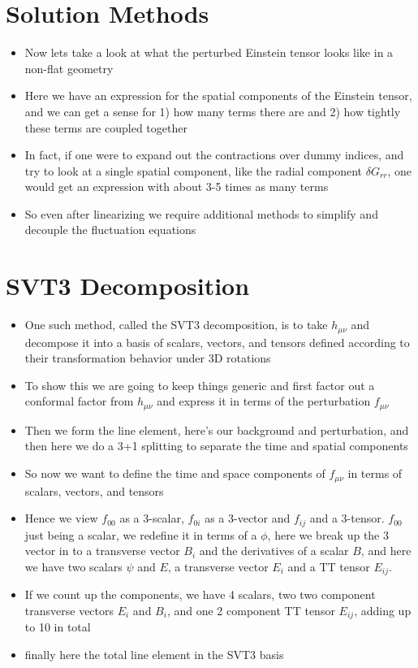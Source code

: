 \documentclass[10pt,letterpaper]{article}
\numberwithin{equation}{section}
\begin{document}
\section{Solution Methods}
\begin{itemize}
	\item Now lets take a look at what the perturbed Einstein tensor looks like in a non-flat geometry
	\item Here we have an expression for the spatial components of the Einstein tensor, and we can get a sense for 1) how many terms there are and 2) how tightly these terms are coupled together
	\item In fact, if one were to expand out the contractions over dummy indices, and try to look at a single spatial component, like the radial component $\delta G_{rr}$, one would get an expression with about 3-5 times as many terms
	\item So even after linearizing we require additional methods to simplify and decouple the fluctuation equations
\end{itemize}



\section{SVT3 Decomposition}
\begin{itemize}
	\item One such method, called the SVT3 decomposition, is to take $h_{\mu\nu}$ and decompose it into a basis of scalars, vectors, and tensors defined according to their transformation behavior under 3D rotations
	\item To show this we are going to keep things generic and first factor out a conformal factor from $h_{\mu\nu}$ and express it in terms of the perturbation $f_{\mu\nu}$
	\item Then we form the line element, here's our background and perturbation, and then here we do a 3+1 splitting to separate the time and spatial components
	\item So now we want to define the time and space components of $f_{\mu\nu}$ in terms of scalars, vectors, and tensors
	\item Hence we view $f_{00}$ as a 3-scalar, $f_{0i}$ as a 3-vector and $f_{ij}$ and a 3-tensor. $f_{00}$ just being a scalar, we redefine it in terms of a $\phi$, here we break up the 3 vector in to a transverse vector $B_i$ and the derivatives of a scalar $B$, and here we have two scalars $\psi$ and $E$, a transverse vector $E_i$ and a TT tensor $E_{ij}$. 
	\item If we count up the components, we have 4 scalars, two two component transverse vectors $E_i$ and $B_i$, and one 2 component TT tensor $E_{ij}$, adding up to 10 in total
	\item finally here the total line element in the SVT3 basis
\end{itemize}
\end{document}
